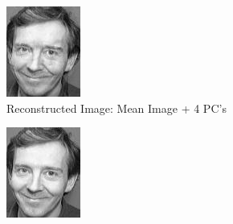 \documentclass[12pt]{article}
\begin{document}
\begin{figure}
\begin{subfigure}[b]{0.20\textwidth}
		\includegraphics[width=\textwidth]{Task4.6_Images/ReconstructedImage4.jpg}
		\caption{Reconstructed Image: Mean Image + 4 PC's}
	\end{subfigure}\quad
	\begin{subfigure}[b]{0.20\textwidth}
		\includegraphics[width=\textwidth]{Task4.6_Images/ReconstructedImage5.jpg}

\end{subfigure}
\end{figure}
\end{document}
